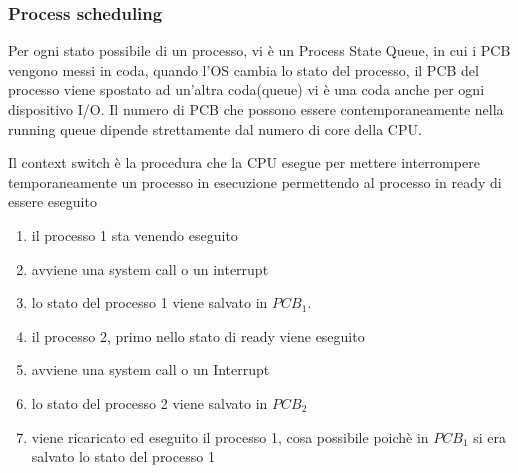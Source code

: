 \documentclass{article}
\begin{document}
        \subsubsection{Process scheduling}

        Per ogni stato possibile di un processo, vi è un Process State Queue, in cui i PCB vengono messi in coda, quando l'OS cambia lo stato del processo, il PCB del processo viene spostato ad un'altra coda(queue) vi è una coda anche per ogni dispositivo I/O.
        Il numero di PCB che possono essere contemporaneamente nella running queue dipende strettamente dal numero di core della CPU.
        
        \begin{tcolorbox}[colback= green!10!white, colframe=green!40!black, title=Context Switch]

            Il context switch è la procedura che la CPU esegue per mettere interrompere temporaneamente un processo in esecuzione permettendo al processo in ready di essere eseguito
        \end{tcolorbox}
%
        \begin{enumerate}
            \item il processo 1 sta venendo eseguito
            \item avviene una system call o un interrupt
            \item lo stato del processo 1 viene salvato in $PCB_1$.
            \item il processo 2, primo nello stato di ready viene eseguito
            \item avviene una system call o un Interrupt
            \item lo stato del processo 2 viene salvato in $PCB_2$
            \item viene ricaricato ed eseguito il processo 1, cosa possibile poichè in $PCB_1$ si era salvato lo stato del processo 1
        \end{enumerate}
\end{document}
